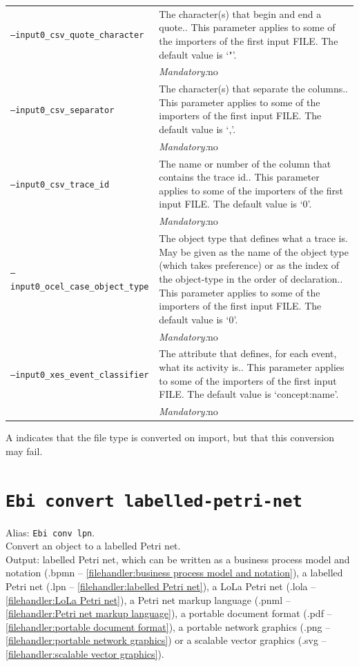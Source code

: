 {\begin{tabularx}{\linewidth}{lX}
\texttt{--input0\_csv\_quote\_character} & The character(s) that begin and end a quote.. This parameter applies to some of the importers of the first input FILE. The default value is `"'.\\
&\textit{Mandatory:}\quad no\\
\texttt{--input0\_csv\_separator} & The character(s) that separate the columns.. This parameter applies to some of the importers of the first input FILE. The default value is `,'.\\
&\textit{Mandatory:}\quad no\\
\texttt{--input0\_csv\_trace\_id} & The name or number of the column that contains the trace id.. This parameter applies to some of the importers of the first input FILE. The default value is `0'.\\
&\textit{Mandatory:}\quad no\\
\texttt{--input0\_ocel\_case\_object\_type} & The object type that defines what a trace is. May be given as the name of the object type (which takes preference) or as the index of the object-type in the order of declaration.. This parameter applies to some of the importers of the first input FILE. The default value is `0'.\\
&\textit{Mandatory:}\quad no\\
\texttt{--input0\_xes\_event\_classifier} & The attribute that defines, for each event, what its activity is.. This parameter applies to some of the importers of the first input FILE. The default value is `concept:name'.\\
&\textit{Mandatory:}\quad no\\
\bottomrule
\end{tabularx}
A \textdagger{} indicates that the file type is converted on import, but that this conversion may fail.
\clearpage\section{\texttt{Ebi convert labelled-petri-net}}
\label{command:Ebi convert labelled-petri-net}
Alias: \texttt{Ebi conv lpn}.\\
Convert an object to a labelled Petri net.\\
\noindent Output: labelled Petri net, which can be written as a business process model and notation (.bpmn -- \cref{filehandler:business process model and notation}), a labelled Petri net (.lpn -- \cref{filehandler:labelled Petri net}), a LoLa Petri net (.lola -- \cref{filehandler:LoLa Petri net}), a Petri net markup language (.pnml -- \cref{filehandler:Petri net markup language}), a portable document format (.pdf -- \cref{filehandler:portable document format}), a portable network graphics (.png -- \cref{filehandler:portable network graphics}) or a scalable vector graphics (.svg -- \cref{filehandler:scalable vector graphics}).\\
}
